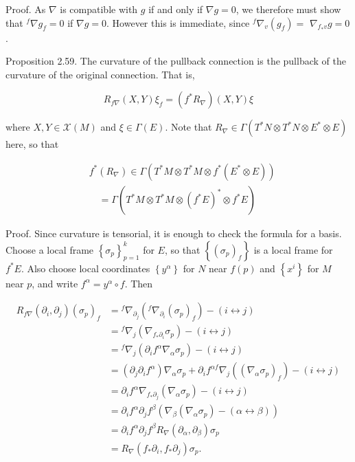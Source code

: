 \documentclass[10pt, letterpaper]{article}
\begin{document}
Proof. As $\nabla$ is compatible with $g$ if and only if $\nabla g=0$, we therefore must show that ${ }^{f} \nabla g_{f}=0$ if $\nabla g=0$. However this is immediate, since ${ }^{f} \nabla_{v}\left(g_{f}\right)=$ $\nabla_{f_{*} v} g=0$.

Proposition 2.59. The curvature of the pullback connection is the pullback of the curvature of the original connection. That is,

$$
R_{f \nabla}(X, Y) \xi_{f}=\left(f^{*} R_{\nabla}\right)(X, Y) \xi
$$

where $X, Y \in \mathscr{X}(M)$ and $\xi \in \Gamma(E)$. Note that $R_{\nabla} \in \Gamma\left(T^{*} N \otimes T^{*} N \otimes E^{*} \otimes E\right)$ here, so that

$$
\begin{aligned}
& f^{*}\left(R_{\nabla}\right) \in \Gamma\left(T^{*} M \otimes T^{*} M \otimes f^{*}\left(E^{*} \otimes E\right)\right) \\
& \quad=\Gamma\left(T^{*} M \otimes T^{*} M \otimes\left(f^{*} E\right)^{*} \otimes f^{*} E\right)
\end{aligned}
$$

Proof. Since curvature is tensorial, it is enough to check the formula for a basis. Choose a local frame $\left\{\sigma_{p}\right\}_{p=1}^{k}$ for $E$, so that $\left\{\left(\sigma_{p}\right)_{f}\right\}$ is a local frame for $f^{*} E$. Also choose local coordinates $\left\{y^{\alpha}\right\}$ for $N$ near $f(p)$ and $\left\{x^{i}\right\}$ for $M$ near $p$, and write $f^{\alpha}=y^{\alpha} \circ f$. Then

$$
\begin{aligned}
R_{f \nabla}\left(\partial_{i}, \partial_{j}\right)\left(\sigma_{p}\right)_{f} & ={ }^{f} \nabla_{\partial_{j}}\left({ }^{f} \nabla_{\partial_{i}}\left(\sigma_{p}\right)_{f}\right)-(i \leftrightarrow j) \\
& ={ }^{f} \nabla_{j}\left(\nabla_{f_{*} \partial_{i}} \sigma_{p}\right)-(i \leftrightarrow j) \\
& ={ }^{f} \nabla_{j}\left(\partial_{i} f^{\alpha} \nabla_{\alpha} \sigma_{p}\right)-(i \leftrightarrow j) \\
& =\left(\partial_{j} \partial_{i} f^{\alpha}\right) \nabla_{\alpha} \sigma_{p}+\partial_{i} f^{\alpha f} \nabla_{j}\left(\left(\nabla_{\alpha} \sigma_{p}\right)_{f}\right)-(i \leftrightarrow j) \\
& =\partial_{i} f^{\alpha} \nabla_{f_{*} \partial_{j}}\left(\nabla_{\alpha} \sigma_{p}\right)-(i \leftrightarrow j) \\
& =\partial_{i} f^{\alpha} \partial_{j} f^{\beta}\left(\nabla_{\beta}\left(\nabla_{\alpha} \sigma_{p}\right)-(\alpha \leftrightarrow \beta)\right) \\
& =\partial_{i} f^{\alpha} \partial_{j} f^{\beta} R_{\nabla}\left(\partial_{\alpha}, \partial_{\beta}\right) \sigma_{p} \\
& =R_{\nabla}\left(f_{*} \partial_{i}, f_{*} \partial_{j}\right) \sigma_{p} .
\end{aligned}
$$
\end{document}
